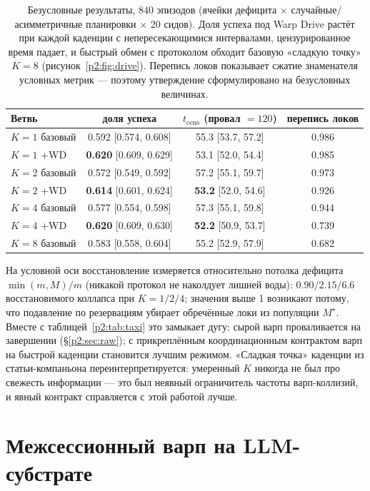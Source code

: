 \documentclass{article}
\newcommand{\mstar}{M^{\star}}
\begin{document}
\begin{table}[h]
\centering
\caption{Безусловные результаты, 840 эпизодов (ячейки дефицита
$\times$ случайные/асимметричные планировки $\times$ 20 сидов). Доля
успеха под Warp Drive растёт при каждой каденции с непересекающимися
интервалами, цензурированное время падает, и быстрый обмен с
протоколом обходит базовую «сладкую точку» $K{=}8$
(рисунок~\ref{p2:fig:drive}). Перепись локов показывает сжатие
знаменателя условных метрик --- поэтому утверждение сформулировано на
безусловных величинах.}
\label{p2:tab:wd}
\small
\begin{tabular}{lccc}
\toprule
Ветвь & доля успеха & $t_{\text{cens}}$ (провал $=120$) & перепись локов \\
\midrule
$K{=}1$ базовый & 0.592 [0.574, 0.608] & 55.3 [53.7, 57.2] & 0.986 \\
$K{=}1$ +WD  & \textbf{0.620} [0.609, 0.629] & 53.1 [52.0, 54.4] & 0.985 \\
$K{=}2$ базовый & 0.572 [0.549, 0.592] & 57.2 [55.1, 59.7] & 0.973 \\
$K{=}2$ +WD  & \textbf{0.614} [0.601, 0.624] & \textbf{53.2} [52.0, 54.6] & 0.926 \\
$K{=}4$ базовый & 0.577 [0.554, 0.598] & 57.3 [55.1, 59.8] & 0.944 \\
$K{=}4$ +WD  & \textbf{0.620} [0.609, 0.630] & \textbf{52.2} [50.9, 53.7] & 0.739 \\
$K{=}8$ базовый & 0.583 [0.558, 0.604] & 55.2 [52.9, 57.9] & 0.682 \\
\bottomrule
\end{tabular}
\end{table}

На условной оси восстановление измеряется относительно потолка
дефицита $\min(m,M)/m$ (никакой протокол не наколдует лишней воды):
$0.90 / 2.15 / 6.6$ восстановимого коллапса при $K{=}1/2/4$; значения
выше 1 возникают потому, что подавление по резервациям убирает
обречённые локи из популяции $\mstar$. Вместе с
таблицей~\ref{p2:tab:taxi} это замыкает дугу: сырой варп проваливается
на завершении (\S\ref{p2:sec:raw}); с прикреплённым координационным
контрактом варп на быстрой каденции становится лучшим режимом.
«Сладкая точка» каденции из статьи-компаньона переинтерпретируется:
умеренный $K$ никогда не был про свежесть информации --- это был
неявный ограничитель частоты варп-коллизий, и явный контракт
справляется с этой работой лучше.

\section{Межсессионный варп на LLM-субстрате}
\label{p2:sec:llm}
\end{document}
